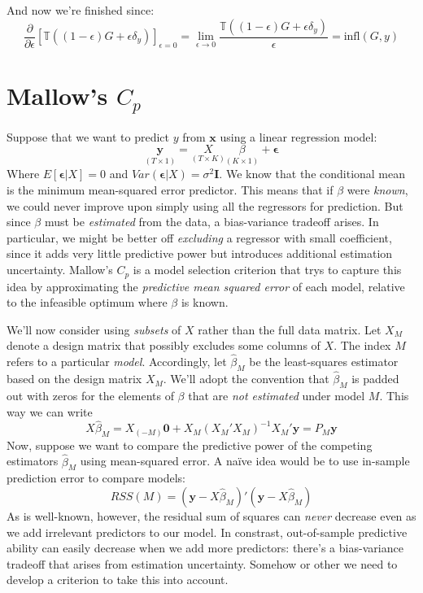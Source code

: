 \documentclass[12pt]{article}
\theoremstyle{definition}
\begin{document}
And now we're finished since:
$$\frac{\partial}{\partial\epsilon}\left[\mathbb{T}\left(\left(1-\epsilon\right)G+\epsilon\delta_{y}\right)\right]_{\epsilon = 0} = \lim_{\epsilon \rightarrow 0} \frac{\mathbb{T}\left(\left(1-\epsilon\right)G+\epsilon\delta_{y}\right)}{\epsilon} = \mbox{infl}(G,y)$$


\section{Mallow's $C_p$}
Suppose that we want to predict $y$ from $\mathbf{x}$ using a linear regression model:
	$$\underset{(T\times1)}{\textbf{y}} = \underset{(T\times K)}{X} \underset{(K\times 1)}{\beta} + \boldsymbol{\epsilon}$$
Where $E[\boldsymbol{\epsilon}|X] = 0$ and $Var(\boldsymbol{\epsilon}|X) = \sigma^2 \mathbf{I}$. We know that the conditional mean is the minimum mean-squared error predictor. This means that if $\beta$ were \emph{known}, we could never improve upon simply using all the regressors for prediction. But since $\beta$ must be \emph{estimated} from the data, a bias-variance tradeoff arises. In particular, we might be better off \emph{excluding} a regressor with small coefficient, since it adds very little predictive power but introduces additional estimation uncertainty. Mallow's $C_p$ is a model selection criterion that trys to capture this idea by approximating the \emph{predictive mean squared error} of each model, relative to the infeasible optimum where $\beta$ is known.

We'll now consider using \emph{subsets} of $X$ rather than the full data matrix. Let $X_M$ denote a design matrix that possibly excludes some columns of $X$. The index $M$ refers to a particular \emph{model}. Accordingly, let $\widehat{\beta}_M$ be the least-squares estimator based on the design matrix $X_M$. We'll adopt the convention that $\widehat{\beta}_M$ is padded out with zeros for the elements of $\beta$ that are \emph{not estimated} under model $M$. This way we can write
	$$X\widehat{\beta}_M = X_{(-M)}\textbf{0} + X_M (X_M'X_M)^{-1} X_M'\textbf{y} = P_M \textbf{y}$$
Now, suppose we want to compare the predictive power of the competing estimators $\widehat{\beta}_M$ using mean-squared error. A na\"{i}ve idea would be to use in-sample prediction error to compare models:
	$$RSS(M) = (\textbf{y} - X\widehat{\beta}_M)'(\textbf{y} - X\widehat{\beta}_M)$$
As is well-known, however, the residual sum of squares can \emph{never} decrease even as we add irrelevant predictors to our model. In constrast, out-of-sample predictive ability can easily decrease when we add more predictors: there's a bias-variance tradeoff that arises from estimation uncertainty. Somehow or other we need to develop a criterion to take this into account.
\end{document}
